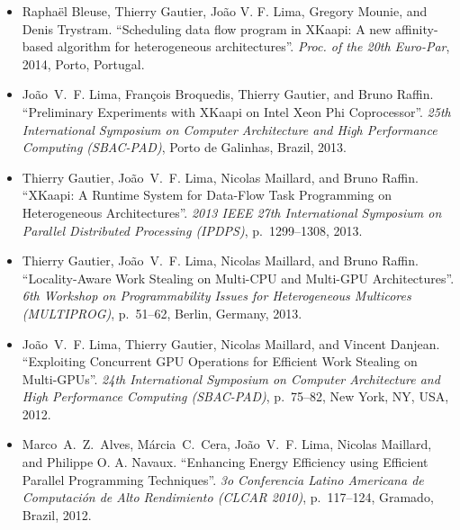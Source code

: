 \documentclass[11pt,a4paper]{article}
\begin{document}
\begin{itemize} \itemsep -2pt

\item
Rapha\"el Bleuse, Thierry Gautier, João V. F. Lima, Gregory Mounie, and Denis Trystram.
``Scheduling data flow program in XKaapi: A new affinity-based algorithm for heterogeneous architectures''.
\emph{Proc. of the 20th Euro-Par}, 2014, Porto, Portugal.

\item 
João~V.~F. Lima, Fran\c{c}ois Broquedis, Thierry Gautier, and Bruno Raffin.
``Preliminary Experiments with XKaapi on Intel Xeon Phi Coprocessor''.
\emph{25th International Symposium on Computer Architecture and
  High Performance Computing (SBAC-PAD)}, Porto de Galinhas, Brazil, 2013.

\item 
Thierry Gautier, João~V.~F. Lima, Nicolas Maillard, and Bruno Raffin.
``XKaapi: A Runtime System for Data-Flow Task Programming on Heterogeneous Architectures''.
\emph{2013 IEEE 27th International Symposium on Parallel Distributed Processing (IPDPS)}, p.~1299--1308, 2013.

\item
Thierry Gautier, João~V.~F. Lima, Nicolas Maillard, and Bruno Raffin.
``Locality-Aware Work Stealing on Multi-CPU and Multi-GPU Architectures''.
\emph{6th Workshop on Programmability Issues for Heterogeneous Multicores (MULTIPROG)}, 
p.~51--62, Berlin, Germany, 2013.

\item 
João~V.~F. Lima, Thierry Gautier, Nicolas Maillard, and Vincent Danjean.
``Exploiting Concurrent GPU Operations for Efficient Work Stealing on Multi-GPUs''.
\emph{24th International Symposium on Computer Architecture and High Performance Computing (SBAC-PAD)}, p.~75--82, New York, NY, USA, 2012.

\item
Marco~A.~Z.~Alves, Márcia~C.~Cera, João~V.~F. Lima, Nicolas Maillard, and Philippe O. A. Navaux.
``Enhancing Energy Efficiency using Efficient Parallel Programming Techniques''.
\emph{3o Conferencia Latino Americana de Computación de Alto Rendimiento (CLCAR 2010)},
p.~117--124, Gramado, Brazil, 2012.

\end{itemize}
\end{document}
